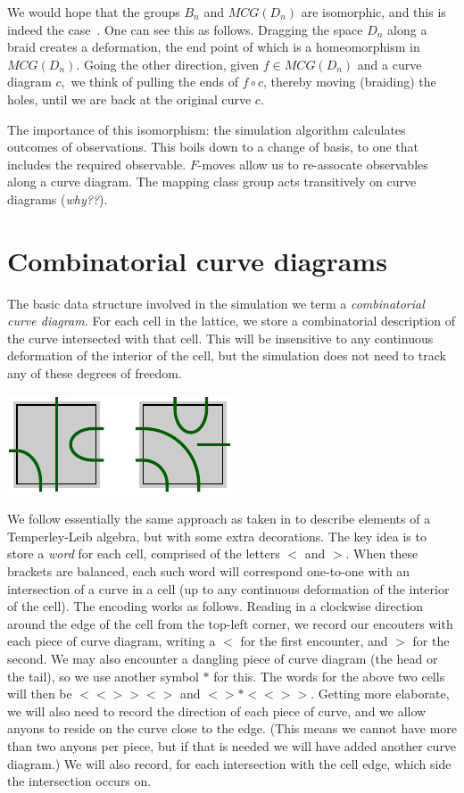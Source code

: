 \documentclass[aps, prl, letterpaper, twocolumn, superscriptaddress, notitlepage, 10pt]{revtex4-1}
\begin{document}
We would hope that the groups $B_n$ and $MCG(D_n)$ are
isomorphic, and this is indeed the case~\cite{Kassel2010}.
One can see this as follows. Dragging the space $D_n$ along
a braid creates a deformation, the end point of which is a
homeomorphism in $MCG(D_n).$ Going the other direction,
given $f\in MCG(D_n)$ and a curve diagram $c,$ we think of
pulling the ends of $f\circ c$, thereby moving (braiding) the holes,
until we are back at the original curve $c.$


The importance of this isomorphism: the simulation
algorithm calculates outcomes of observations. This
boils down to a change of basis, to one that includes
the required observable.
$F$-moves allow us to re-assocate observables along
a curve diagram. The mapping class group acts
transitively on curve diagrams (\emph{why??}).


\section{Combinatorial curve diagrams}

The basic data structure involved in the
simulation we term a \emph{combinatorial curve
diagram.}
For each cell in the lattice,
we store a combinatorial
description of the curve intersected with that cell.
This will be insensitive to any continuous deformation of the interior of the cell,
but the simulation does not need to track any of these degrees of freedom.
\begin{center}
\includegraphics[]{pic-cells.pdf}
\end{center}
We follow essentially the same approach as taken in \cite{Abramsky2007} 
to describe elements of a Temperley-Leib algebra, but
with some extra decorations.
The key idea is to store a \emph{word} for each cell, comprised of
the letters $<$ and $>$.
When these brackets are balanced,
each such word will correspond one-to-one with an intersection
of a curve in a cell (up to any continuous deformation of the interior of the cell).
The encoding works as follows.
Reading in a clockwise direction around the edge of
the cell from the top-left corner,
we record our encouters with each piece of curve diagram,
writing a $<$ for the first encounter, and $>$ for the
second. We may also encounter a dangling piece of curve
diagram (the head or the tail), so we use another symbol $*$ for this.
The words for the above two cells will then be $<<>><>$ and $<>*<<>>.$
Getting more elaborate, we will also need to record the direction
of each piece of curve,
and we allow anyons to reside on the curve
close to the edge. (This means we cannot have more than two anyons
per piece, but if that is needed we will have added another curve diagram.)
We will also record,
for each intersection with the cell edge, which side the
intersection occurs on.
\end{document}
